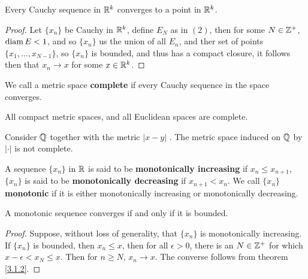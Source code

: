 \begin{corollary}
    Every Cauchy sequence in $\mathbb{R}^k$ converges to a point in  $\mathbb{R}^k$.
\end{corollary}
\begin{proof}
    Let $\{x_n\}$ be Cauchy in  $\mathbb{R}^k$, define $E_N$ as in  $(2)$, then for some  $N \in \mathbb{Z}^+$,
$\operatorname{diam}{E}<1$, and so  $\{x_n\}$ us the union of all  $E_n$, and ther set of points
$\{x_1,\dots, x_{N-1}\}$, so $\{x_n\}$ is bounded, and thus has a compact closure, it follows then
that  $x_n \rightarrow x$ for some  $x \in \mathbb{R}^k$.
\end{proof}

\begin{definition}
    We call a metric space \textbf{complete} if every Cauchy sequence in the space converges.
\end{definition}

\begin{theorem}\label{3.3.4}
    All compact metric spaces, and all Euclidean spaces are complete.
\end{theorem}

\begin{example}
    Consider $\mathbb{Q}$ together with the metric  $|x-y|$	. The metric space induced on $\mathbb{Q}$ by  $|\cdot|$ is
    not complete.
\end{example}

\begin{definition}
    A sequence $\{x_n\}$ in $\mathbb{R}$ is said to be \textbf{monotonically increasing} if
    $x_n \leq x_{n+1}$, $\{x_n\}$ is said to be \textbf{monotonically decreasing} if $x_{n+1}<x_n$.
    We call  $\{x_n\}$ \textbf{monotonic} if it is either monotonically increasing or monotonically
    decreasing.
\end{definition}

\begin{theorem}\label{3.3.5}
    A monotonic sequence converges if and only if it is bounded.
\end{theorem}
\begin{proof}
    Suppose, without loss of generality, that $\{x_n\}$ is monotonically increasing. If
    $\{x_n\}$ is bounded, then  $x_n \leq x$, then for all  $\epsilon>0$, there is an  $N \in \mathbb{Z}^+$
    for which  $x-\epsilon<x_N \leq x$. Then for  $n \geq N$,  $x_n \rightarrow x$. The converse follows
    from theorem  \ref{3.1.2}.
\end{proof}
